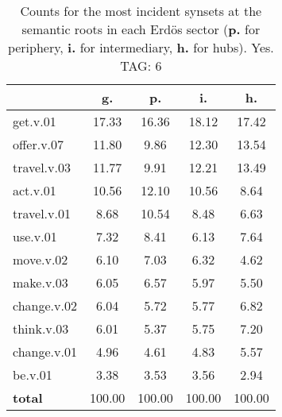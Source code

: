 \begin{table}[h!]
\begin{center}
\begin{tabular}{| l | c | c | c | c |}\hline
 & g. & p. & i. & h. \\\hline
get.v.01 & 17.33  & 16.36  & 18.12  & 17.42 \\\hline
offer.v.07 & 11.80  & 9.86  & 12.30  & 13.54 \\\hline
travel.v.03 & 11.77  & 9.91  & 12.21  & 13.49 \\\hline
act.v.01 & 10.56  & 12.10  & 10.56  & 8.64 \\\hline
travel.v.01 & 8.68  & 10.54  & 8.48  & 6.63 \\\hline
use.v.01 & 7.32  & 8.41  & 6.13  & 7.64 \\\hline
move.v.02 & 6.10  & 7.03  & 6.32  & 4.62 \\\hline
make.v.03 & 6.05  & 6.57  & 5.97  & 5.50 \\\hline
change.v.02 & 6.04  & 5.72  & 5.77  & 6.82 \\\hline
think.v.03 & 6.01  & 5.37  & 5.75  & 7.20 \\\hline
change.v.01 & 4.96  & 4.61  & 4.83  & 5.57 \\\hline
be.v.01 & 3.38  & 3.53  & 3.56  & 2.94 \\\hline
{{\bf total}} & 100.00  & 100.00  & 100.00  & 100.00 \\\hline
\end{tabular}
\caption{Counts for the most incident synsets at the semantic roots in each Erd\"os sector ({\bf p.} for periphery, {\bf i.} for intermediary, {\bf h.} for hubs). Yes. TAG: 6}
\end{center}
\end{table}